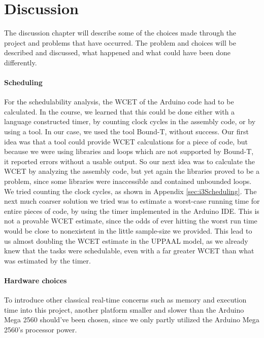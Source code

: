 \chapter{Discussion}
\label{chap:Discussion}
The discussion chapter will describe some of the choices made through the project and problems that have occurred. The problem and choices will be described and discussed, what happened and what could have been done differently. 


\subsubsection{Scheduling}
For the schedulability analysis, the WCET of the Arduino code had to be calculated. In the course, we learned that this could be done either with a language constructed timer, by counting clock cycles in the assembly code, or by using a tool. In our case, we used the tool Bound-T, without success. Our first idea was that a tool could provide WCET calculations for a piece of code, but because we were using libraries and loops which are not supported by Bound-T, it reported errors without a usable output. So our next idea was to calculate the WCET by analyzing the assembly code, but yet again the libraries proved to be a problem, since some libraries were inaccessible and contained unbounded loops. We tried counting the clock cycles, as shown in Appendix \ref{sec:i3Scheduling}. The next much coarser solution we tried was to estimate a worst-case running time for entire pieces of code, by using the timer implemented in the Arduino IDE. This is not a provable WCET estimate, since the odds of ever hitting the worst run time would be close to nonexistent in the little sample-size we provided. This lead to us almost doubling the WCET estimate in the UPPAAL model, as we already knew that the tasks were schedulable, even with a far greater WCET than what was estimated by the timer.


\subsubsection{Hardware choices}
To introduce other classical real-time concerns such as memory and execution time into this project, another platform smaller and slower than the Arduino Mega 2560 should’ve been chosen, since we only partly utilized the Arduino Mega 2560’s processor power. 


